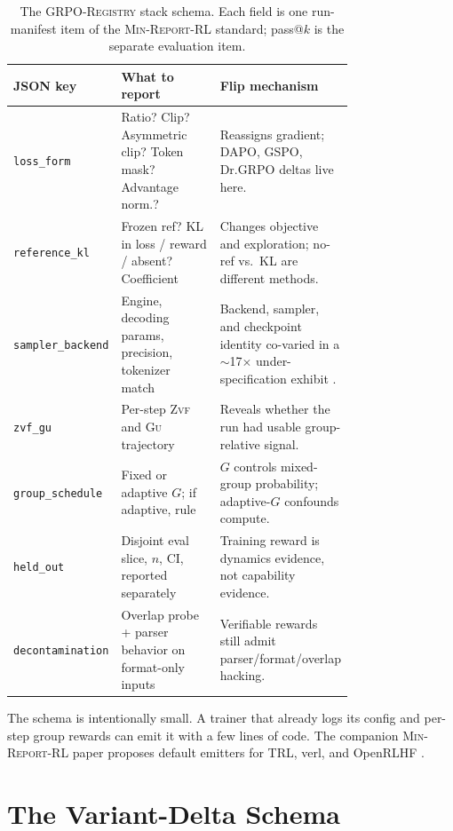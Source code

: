 \documentclass[11pt]{article}
\newcommand{\zvf}{\textsc{Zvf}}
\newcommand{\gu}{\textsc{Gu}}
\newcommand{\minreport}{\textsc{Min-Report-RL}}
\newcommand{\grpo}{\textsc{GRPO}}
\newcommand{\grpoReg}{\textsc{GRPO-Registry}}
\begin{document}
\begin{table}[t]
\centering
\caption{The \grpoReg{} stack schema. Each field is one run-manifest item of
  the \minreport{} standard; pass@$k$ is the separate evaluation item.}
\label{tab:stack-schema}
\small
\begin{tabular}{@{}lp{0.40\linewidth}p{0.36\linewidth}@{}}
\toprule
\textbf{JSON key} & \textbf{What to report} & \textbf{Flip mechanism}\\
\midrule
\texttt{loss\_form} & Ratio? Clip? Asymmetric clip? Token mask? Advantage norm.?
  & Reassigns gradient; DAPO, GSPO, Dr.\grpo{} deltas live here.\\
\texttt{reference\_kl} & Frozen ref? KL in loss / reward / absent? Coefficient &
  Changes objective and exploration; no-ref vs.\ KL are different methods.\\
\texttt{sampler\_backend} & Engine, decoding params, precision, tokenizer match &
  Backend, sampler, and checkpoint identity co-varied in a $\sim$17$\times$
  under-specification exhibit \cite{zvfaudit2026}.\\
\texttt{zvf\_gu} & Per-step \zvf{} and \gu{} trajectory &
  Reveals whether the run had usable group-relative signal.\\
\texttt{group\_schedule} & Fixed or adaptive $G$; if adaptive, rule &
  $G$ controls mixed-group probability; adaptive-$G$ confounds compute.\\
\texttt{held\_out} & Disjoint eval slice, $n$, CI, reported separately &
  Training reward is dynamics evidence, not capability evidence.\\
\texttt{decontamination} & Overlap probe + parser behavior on format-only inputs &
  Verifiable rewards still admit parser/format/overlap hacking.\\
\bottomrule
\end{tabular}
\end{table}

The schema is intentionally small. A trainer that already logs its config and
per-step group rewards can emit it with a few lines of code. The companion
\minreport{} paper proposes default emitters for TRL, verl, and OpenRLHF
\cite{minreportrl2026}.

\section{The Variant-Delta Schema}
\label{sec:delta-schema}
\end{document}

